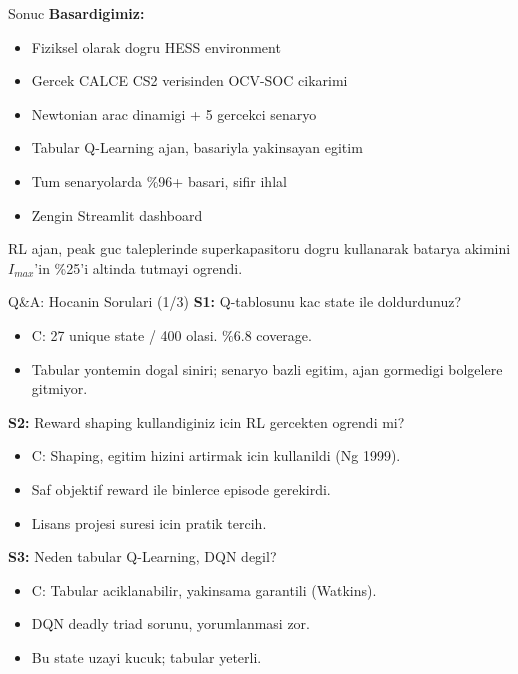 \documentclass[10pt,aspectratio=169]{beamer}
\begin{document}
\begin{frame}{Sonuc}
\textbf{Basardigimiz:}
\begin{itemize}
  \item Fiziksel olarak dogru HESS environment
  \item Gercek CALCE CS2 verisinden OCV-SOC cikarimi
  \item Newtonian arac dinamigi + 5 gercekci senaryo
  \item Tabular Q-Learning ajan, basariyla yakinsayan egitim
  \item Tum senaryolarda \%96+ basari, sifir ihlal
  \item Zengin Streamlit dashboard
\end{itemize}

\vspace{0.5em}
\begin{tcolorbox}[colback=green!8,colframe=green!50!black,boxrule=0.4pt]
RL ajan, peak guc taleplerinde superkapasitoru dogru kullanarak batarya akimini $I_{max}$'in \%25'i altinda tutmayi ogrendi.
\end{tcolorbox}
\end{frame}

\begin{frame}{Q\&A: Hocanin Sorulari (1/3)}
\textbf{S1:} Q-tablosunu kac state ile doldurdunuz?
\begin{itemize}\footnotesize
  \item C: 27 unique state / 400 olasi. \%6.8 coverage.
  \item Tabular yontemin dogal siniri; senaryo bazli egitim, ajan gormedigi bolgelere gitmiyor.
\end{itemize}

\textbf{S2:} Reward shaping kullandiginiz icin RL gercekten ogrendi mi?
\begin{itemize}\footnotesize
  \item C: Shaping, egitim hizini artirmak icin kullanildi (Ng 1999).
  \item Saf objektif reward ile binlerce episode gerekirdi.
  \item Lisans projesi suresi icin pratik tercih.
\end{itemize}

\textbf{S3:} Neden tabular Q-Learning, DQN degil?
\begin{itemize}\footnotesize
  \item C: Tabular aciklanabilir, yakinsama garantili (Watkins).
  \item DQN deadly triad sorunu, yorumlanmasi zor.
  \item Bu state uzayi kucuk; tabular yeterli.
\end{itemize}
\end{frame}
\end{document}
